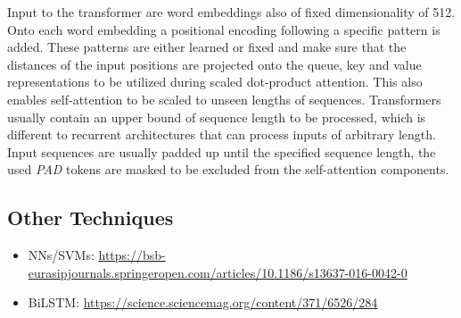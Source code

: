 Input to the transformer are word embeddings also of fixed dimensionality of 512. Onto each word embedding a positional encoding following a specific pattern is added. These patterns are either learned or fixed and make sure that the distances of the input positions are projected onto the queue, key and value representations to be utilized during scaled dot-product attention. This also enables self-attention to be scaled to unseen lengths of sequences. Transformers usually contain an upper bound of sequence length to be processed, which is different to recurrent architectures that can process inputs of arbitrary length. Input sequences are usually padded up until the specified sequence length, the used \textit{PAD} tokens are masked to be excluded from the self-attention components. \cite{Alammar2018, Vaswani2017}


\subsection{Other Techniques} \label{fundamentalsH}

\begin{itemize}
	\item NNs/SVMs: \url{https://bsb-eurasipjournals.springeropen.com/articles/10.1186/s13637-016-0042-0}
	\item BiLSTM: \url{https://science.sciencemag.org/content/371/6526/284}
\end{itemize}


\newpage
